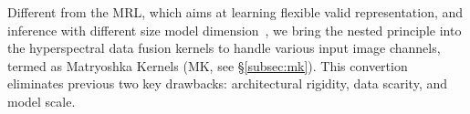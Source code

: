
Different from the MRL, which aims at learning flexible valid representation, and inference with different size model dimension~\cite{lin2024matryoshkakv,wang2024train}, we bring the nested principle into the hyperspectral data fusion kernels to handle various input image channels, termed as Matryoshka Kernels (MK, see \S  \ref{subsec:mk}).
This convertion eliminates  previous two key drawbacks: architectural rigidity, data scarity, and model scale.  



